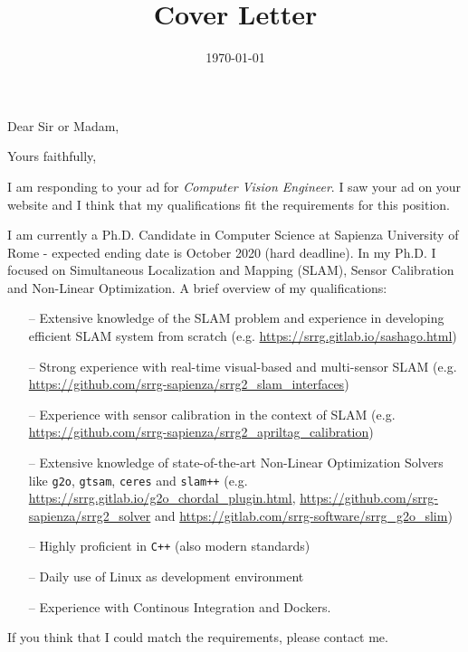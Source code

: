 \documentclass[11pt,a4paper,roman]{moderncv}
\title{Cover Letter}                               %
\begin{document}
\date{\today}
\opening{Dear Sir or Madam,}
\closing{Yours faithfully,}
\makelettertitle

I am responding to your ad for \emph{Computer Vision Engineer}.
I saw your ad on your website and I think that my qualifications
fit the requirements for this position.

I am currently a Ph.D. Candidate in Computer Science at Sapienza University of Rome -
expected ending date is October 2020 (hard deadline).
In my Ph.D. I focused on Simultaneous Localization and Mapping (SLAM), Sensor Calibration and
Non-Linear Optimization. A brief overview of my qualifications:

\vspace{10pt}
\begin{itemize}
\item[--] Extensive knowledge of the SLAM problem and
  experience in developing efficient SLAM system from scratch
  (e.g. \url{https://srrg.gitlab.io/sashago.html})
\item[--] Strong experience with real-time visual-based and multi-sensor SLAM (e.g. \url{https://github.com/srrg-sapienza/srrg2_slam_interfaces})
\item[--] Experience with sensor calibration in the context of SLAM (e.g. \url{https://github.com/srrg-sapienza/srrg2_apriltag_calibration})
\item[--] Extensive knowledge of state-of-the-art Non-Linear Optimization Solvers like \texttt{g2o}, \texttt{gtsam}, \texttt{ceres} and \texttt{slam++}
  (e.g. \url{https://srrg.gitlab.io/g2o_chordal_plugin.html},
  \url{https://github.com/srrg-sapienza/srrg2_solver} and
  \url{https://gitlab.com/srrg-software/srrg_g2o_slim})
\item[--] Highly proficient in \texttt{C++} (also modern standards)
\item[--] Daily use of Linux as development environment
\item[--] Experience with Continous Integration and Dockers.
\end{itemize}
\vspace{10pt}

If you think that I could match the requirements, please contact me.

\makeletterclosing
\end{document}
